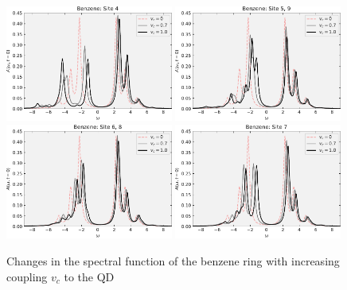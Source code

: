 \begin{figure}[!hbt]
    \centering
    \includegraphics[width=0.49\textwidth]{graph/spectrum_vc_sweep/Benz_4_07_10.pdf}
    \includegraphics[width=0.49\textwidth]{graph/spectrum_vc_sweep/Benz_59_07_10.pdf}
    \includegraphics[width=0.49\textwidth]{graph/spectrum_vc_sweep/Benz_68_07_10.pdf}
    \includegraphics[width=0.49\textwidth]{graph/spectrum_vc_sweep/Benz_7_07_10.pdf}
    \caption{Changes in the spectral function of the benzene ring with increasing coupling $v_c$ to the QD}
    \label{fig:spectrum_vc_sweep_benzene}
\end{figure}

